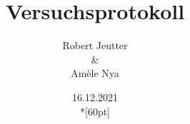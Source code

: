 \documentclass[a4paper,10pt,titlepage]{scrartcl}
\begin{document}
\titlehead
{
    \small
    {
        Technische Universität Ilmenau\\
        Fakulät IA\\
        Institut für Biomedizinische Technik und Informatik\\

        Praktikum Deep Learning in der Biomedizintechnik\\
        WS 2021/22}
}

\title {Versuchsprotokoll}
\subtitle{ Robert Jeutter\\ \&\\ Amèle Nya}
\author{}
\date{16.12.2021\\*[60pt]}
\maketitle

\pagestyle{fancy}
\newpage
\end{document}
